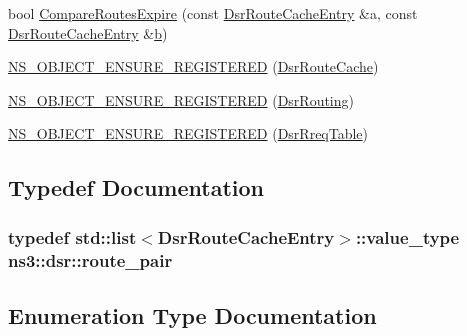 \begin{DoxyCompactItemize}
\item 
bool \hyperlink{namespacens3_1_1dsr_a53bce2b069de9151de0203d96468684e}{Compare\+Routes\+Expire} (const \hyperlink{classns3_1_1dsr_1_1DsrRouteCacheEntry}{Dsr\+Route\+Cache\+Entry} \&a, const \hyperlink{classns3_1_1dsr_1_1DsrRouteCacheEntry}{Dsr\+Route\+Cache\+Entry} \&\hyperlink{lte__pathloss_8m_a21ad0bd836b90d08f4cf640b4c298e7c}{b})
\item 
\hyperlink{namespacens3_1_1dsr_a4d6bbf0fd6db8429259756c3f655f04b}{N\+S\+\_\+\+O\+B\+J\+E\+C\+T\+\_\+\+E\+N\+S\+U\+R\+E\+\_\+\+R\+E\+G\+I\+S\+T\+E\+R\+ED} (\hyperlink{classns3_1_1dsr_1_1DsrRouteCache}{Dsr\+Route\+Cache})
\item 
\hyperlink{namespacens3_1_1dsr_a6722e1304bbb42f26d252bb3e49f6e65}{N\+S\+\_\+\+O\+B\+J\+E\+C\+T\+\_\+\+E\+N\+S\+U\+R\+E\+\_\+\+R\+E\+G\+I\+S\+T\+E\+R\+ED} (\hyperlink{classns3_1_1dsr_1_1DsrRouting}{Dsr\+Routing})
\item 
\hyperlink{namespacens3_1_1dsr_aeea952d6616879550e43c4b98524f3ba}{N\+S\+\_\+\+O\+B\+J\+E\+C\+T\+\_\+\+E\+N\+S\+U\+R\+E\+\_\+\+R\+E\+G\+I\+S\+T\+E\+R\+ED} (\hyperlink{classns3_1_1dsr_1_1DsrRreqTable}{Dsr\+Rreq\+Table})
\end{DoxyCompactItemize}


\subsection{Typedef Documentation}
\subsubsection[{\texorpdfstring{route\+\_\+pair}{route_pair}}]{\setlength{\rightskip}{0pt plus 5cm}typedef {\bf std\+::list}$<${\bf Dsr\+Route\+Cache\+Entry}$>$\+::value\+\_\+type {\bf ns3\+::dsr\+::route\+\_\+pair}}\hypertarget{namespacens3_1_1dsr_aef011a0193cb8462ab3c02212b142dc9}{}\label{namespacens3_1_1dsr_aef011a0193cb8462ab3c02212b142dc9}


\subsection{Enumeration Type Documentation}
